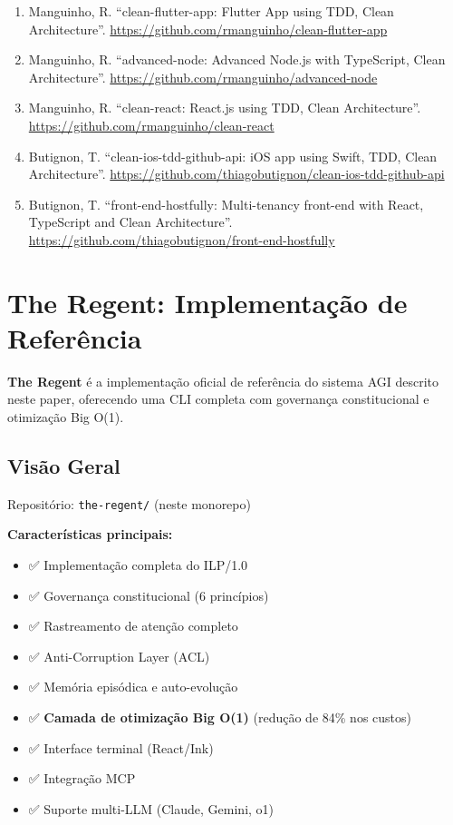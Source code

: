 \documentclass[11pt]{article}
\begin{document}
\begin{enumerate}
    \item Manguinho, R. ``clean-flutter-app: Flutter App using TDD, Clean Architecture''. \url{https://github.com/rmanguinho/clean-flutter-app}
    \item Manguinho, R. ``advanced-node: Advanced Node.js with TypeScript, Clean Architecture''. \url{https://github.com/rmanguinho/advanced-node}
    \item Manguinho, R. ``clean-react: React.js using TDD, Clean Architecture''. \url{https://github.com/rmanguinho/clean-react}
    \item Butignon, T. ``clean-ios-tdd-github-api: iOS app using Swift, TDD, Clean Architecture''. \url{https://github.com/thiagobutignon/clean-ios-tdd-github-api}
    \item Butignon, T. ``front-end-hostfully: Multi-tenancy front-end with React, TypeScript and Clean Architecture''. \url{https://github.com/thiagobutignon/front-end-hostfully}
\end{enumerate}

\appendix

\section{The Regent: Implementação de Referência}

\textbf{The Regent} é a implementação oficial de referência do sistema AGI descrito neste paper, oferecendo uma CLI completa com governança constitucional e otimização Big O(1).

\subsection{Visão Geral}

Repositório: \texttt{the-regent/} (neste monorepo)

\textbf{Características principais:}
\begin{itemize}
    \item ✅ Implementação completa do ILP/1.0
    \item ✅ Governança constitucional (6 princípios)
    \item ✅ Rastreamento de atenção completo
    \item ✅ Anti-Corruption Layer (ACL)
    \item ✅ Memória episódica e auto-evolução
    \item ✅ \textbf{Camada de otimização Big O(1)} (redução de 84\% nos custos)
    \item ✅ Interface terminal (React/Ink)
    \item ✅ Integração MCP
    \item ✅ Suporte multi-LLM (Claude, Gemini, o1)
\end{itemize}
\end{document}
